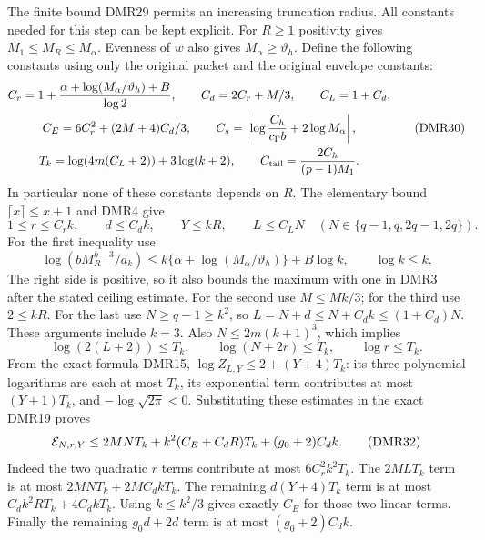The finite bound DMR29 permits an increasing truncation radius.
All constants needed for this step can be kept explicit.
For $R\geq1$ positivity gives $M_1\leq M_R\leq M_\alpha$.
Evenness of $w$ also gives $M_\alpha\geq\vartheta_h$.
Define the following constants using only the original packet
and the original envelope constants:
\[
 \begin{gathered}
 C_r=1+\frac{\alpha+\log(M_\alpha/\vartheta_h)+B}{\log2},
 \qquad C_d=2C_r+M/3,\qquad C_L=1+C_d,\\
 C_E=6C_r^2+(2M+4)C_d/3,\qquad
 C_s=\left|\log\frac{C_h}{c_\Gamma b}+2\log M_\alpha\right|,\\
 T_k=\log(4m(C_L+2))+3\log(k+2),\qquad
 C_{\rm tail}=\frac{2C_h}{(p-1)M_1}.
 \end{gathered}\tag{DMR30}
\]
In particular none of these constants depends on $R$.
The elementary bound $\lceil x\rceil\leq x+1$ and DMR4 give
\[
 1\leq r\leq C_r k,\qquad
 d\leq C_d k,\qquad Y\leq kR,\qquad L\leq C_L N
 \quad(N\in\{q-1,q,2q-1,2q\}).
 \tag{DMR31}
\]
For the first inequality use
\[
 \log(bM_R^{k-3}/a_k)
 \leq k\{\alpha+\log(M_\alpha/\vartheta_h)\}+B\log k,
 \qquad \log k\leq k.
\]
The right side is positive, so it also bounds the maximum with
one in DMR3 after the stated ceiling estimate. For the second
use $M\leq Mk/3$; for the third use $2\leq kR$.
For the last use $N\geq q-1\geq k^2$, so
$L=N+d\leq N+C_dk\leq(1+C_d)N$.
These arguments include $k=3$.
Also $N\leq2m(k+1)^3$, which implies
\[
 \log(2(L+2))\leq T_k,\qquad
 \log(N+2r)\leq T_k,\qquad \log r\leq T_k .
\]
From the exact formula DMR15,
$\log Z_{L,Y}\leq2+(Y+4)T_k$:
its three polynomial logarithms are each at most $T_k$,
its exponential term contributes at most $(Y+1)T_k$,
and $-\log\sqrt{2\pi}<0$.
Substituting these estimates in the exact DMR19 proves
\[
 {\cal E}_{N,r,Y}
 \leq 2MNT_k+k^2(C_E+C_dR)T_k+(g_0+2)C_dk .
 \tag{DMR32}
\]
Indeed the two quadratic $r$ terms contribute at most
$6C_r^2k^2T_k$. The $2MLT_k$ term is at most
$2MNT_k+2MC_dkT_k$. The remaining $d(Y+4)T_k$ term
is at most $C_dk^2RT_k+4C_dkT_k$.
Using $k\leq k^2/3$ gives exactly $C_E$ for those two
linear terms. Finally the remaining $g_0d+2d$ term
is at most $(g_0+2)C_dk$.


